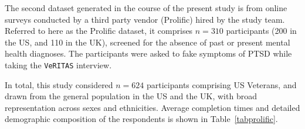 \documentclass[onecolumn,10pt]{IEEEtran}
\def\vrts{\texttt{VeRITAS}\xspace}
\begin{document}
The second dataset generated in the course of the present study is from online surveys conducted by a third party vendor (Prolific) hired by the study team. Referred to here as the Prolific dataset, it comprises $n= 310$ participants (200 in the US, and 110 in the UK), screened for the absence of past or present mental health diagnoses. The participants were asked to fake symptoms of PTSD while taking the \vrts interview. 

In total, this study considered {\color{Red1} $n=624$} participants comprising  US Veterans, and drawn from the  general population in the US and the UK, with broad representation across sexes and ethnicities. Average completion times and detailed demographic composition of the respondents is shown in Table~\ref{tabprolific}.


\begin{table}[t]
  \centering
  
  \label{tabprolific}
  \sffamily\fontsize{10}{10}\selectfont

\end{table}

\begin{table}[t]
  \centering
  
  \label{tabperf}


  \sffamily\fontsize{10}{8}\selectfont
  

\end{table}


\begin{figure}
  \tikzexternalenable

  \centering
  
  

  \captionN{}\label{figperf}
\end{figure}
\end{document}
